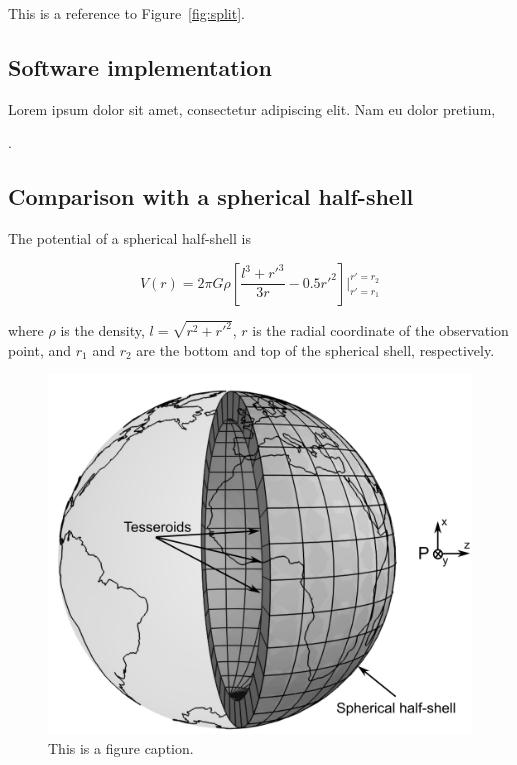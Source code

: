\documentclass[paper,twocolumn,twoside]{geophysics}
\begin{document}
This is a reference to Figure~\ref{fig:split}.

\subsection{Software implementation}

Lorem ipsum dolor sit amet, consectetur adipiscing elit. Nam eu dolor pretium,

\citet{Barrera-Figueroa2006}.

\subsection{Comparison with a spherical half-shell}


The potential of a spherical half-shell is

\begin{equation}
    V(r) = 2\pi G \rho \left[ \dfrac{l^3 + {r'}^3}{3r} - 0.5 {r'}^2 \right]
           \Biggr \rvert_{r'=r_1}^{r'=r_2}
    \label{eq:halfshell-pot}
\end{equation}

\noindent
where $\rho$ is the density,
$l = \sqrt{r^2 + {r'}^2}$,
$r$ is the radial coordinate of the observation point,
and
$r_1$ and $r_2$ are the bottom and top of the spherical shell,
respectively.

\begin{figure}
    \centering
    \includegraphics[width=\columnwidth]{figs/spherical-shell.png}
    \caption{This is a figure caption.}
    \label{fig:shell}
\end{figure}
\end{document}

